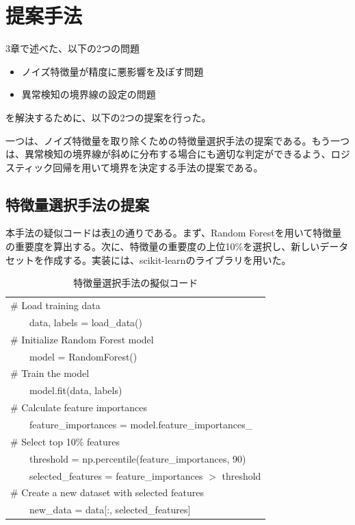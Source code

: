\documentclass{css}
\begin{document}
\section{提案手法}
3章で述べた、以下の2つの問題
\begin{itemize}
    \item ノイズ特徴量が精度に悪影響を及ぼす問題
    \item 異常検知の境界線の設定の問題
\end{itemize}
を解決するために、以下の2つの提案を行った。

一つは、ノイズ特徴量を取り除くための特徴量選択手法の提案である。もう一つは、異常検知の境界線が斜めに分布する場合にも適切な判定ができるよう、ロジスティック回帰を用いて境界を決定する手法の提案である。

\subsection{特徴量選択手法の提案}   
本手法の疑似コードは表\ref{tab:feature_selection}の通りである。まず、Random Forestを用いて特徴量の重要度を算出する。次に、特徴量の重要度の上位10\%を選択し、新しいデータセットを作成する。実装には、scikit-learnのライブラリを用いた\cite{scikit-learn}。

\begin{table}[h!]
    \centering
    \caption{特徴量選択手法の擬似コード}
    \begin{tabular}{|l|}
    \hline
    \# Load training data \\
       \ \ \ \ data, labels = load\_data() \\ 
    \# Initialize Random Forest model \\
       \ \ \ \ model = RandomForest() \\ 
    \# Train the model \\
       \ \ \ \ model.fit(data, labels) \\ 
    \# Calculate feature importances \\
       \ \ \ \ feature\_importances = model.feature\_importances\_ \\ 
    \# Select top 10\% features \\
       \ \ \ \ threshold = np.percentile(feature\_importances, 90) \\
       \ \ \ \ selected\_features = feature\_importances $>$ threshold \\ 
    \# Create a new dataset with selected features \\
       \ \ \ \ new\_data = data[:, selected\_features] \\ \hline
    \end{tabular}
    \label{tab:feature_selection}
\end{table}
\end{document}
